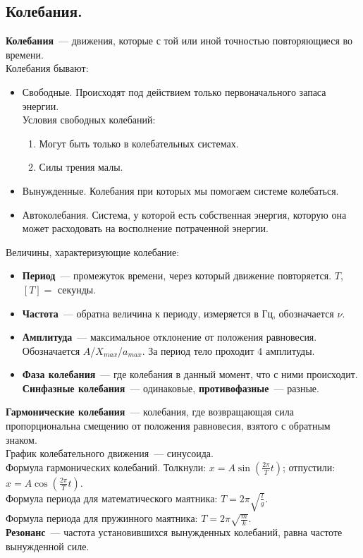 \documentclass{article}
\begin{document}
	\subsection{Колебания.}
	\textbf{Колебания}~--- движения, которые с той или иной точностью повторяющиеся во времени. \\
	Колебания бывают:
	\begin{itemize}
		\item Свободные. Происходят под действием только первоначального запаса энергии. \\
		Условия свободных колебаний:
		\begin{enumerate}
			\item Могут быть только в колебательных системах.
			\item Силы трения малы.
		\end{enumerate}
		\item Вынужденные. Колебания при которых мы помогаем системе колебаться.
		\item Автоколебания. Система, у которой есть собственная энергия, которую она может расходовать на восполнение потраченной энергии.
	\end{itemize}
	Величины, характеризующие колебание:
	\begin{itemize}
		\item \textbf{Период}~--- промежуток времени, через который движение повторяется. $T$, $[T] =$ секунды.
		\item \textbf{Частота}~--- обратна величина к периоду, измеряется в Гц, обозначается $\nu$.
		\item \textbf{Амплитуда}~--- максимальное отклонение от положения равновесия. Обозначается $A$/$X_{max}$/$a_{max}$. За период тело проходит $4$ амплитуды.
		\item \textbf{Фаза колебания}~--- где колебания в данный момент, что с ними происходит. \textbf{Синфазные колебания}~--- одинаковые, \textbf{противофазные}~--- разные.
	\end{itemize}
	\textbf{Гармонические колебания}~--- колебания, где возвращающая сила пропорциональна смещению от положения равновесия, взятого с обратным знаком. \\
	График колебательного движения~--- синусоида. \\
	Формула гармонических колебаний. Толкнули: $x = A \sin (\frac{2\pi}{T} t)$; отпустили: $x = A \cos (\frac{2\pi}{T} t)$. \\
	Формула периода для математического маятника: $T = 2\pi\sqrt{\frac{l}{g}}$. \\
	Формула периода для пружинного маятника: $T = 2\pi\sqrt{\frac{m}{k}}$. \\
	\textbf{Резонанс}~--- частота установившихся вынужденных колебаний, равна частоте вынужденной силе.
\end{document}

